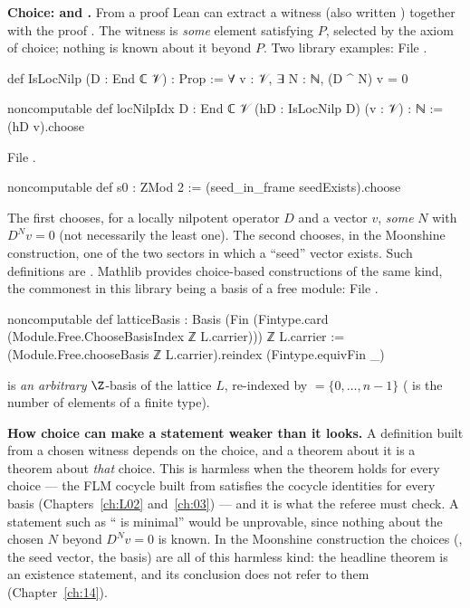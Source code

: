 \textbf{Choice:  and .} From a proof 
Lean can extract a witness  (also written ) together with
the proof . The witness is \emph{some} element satisfying $P$,
selected by the axiom of choice; nothing is known about it beyond $P$. Two library examples:
\noindent File .
\begin{leancode}
def IsLocNilp (D : End ℂ 𝒱) : Prop := ∀ v : 𝒱, ∃ N : ℕ, (D ^ N) v = 0

noncomputable def locNilpIdx {D : End ℂ 𝒱} (hD : IsLocNilp D) (v : 𝒱) : ℕ := (hD v).choose
\end{leancode}
\noindent File .
\begin{leancode}
noncomputable def s0 : ZMod 2 := (seed_in_frame seedExists).choose
\end{leancode}
The first chooses, for a locally nilpotent operator $D$ and a vector $v$, \emph{some} $N$ with
$D^Nv = 0$ (not necessarily the least one). The second chooses, in the Moonshine construction, one of
the two sectors in which a ``seed'' vector exists. Such definitions are . Mathlib
provides choice-based constructions of the same kind, the commonest in this library being a basis of
a free module:
\noindent File .
\begin{leancode}
noncomputable def latticeBasis :
    Basis (Fin (Fintype.card (Module.Free.ChooseBasisIndex ℤ L.carrier))) ℤ L.carrier :=
  (Module.Free.chooseBasis ℤ L.carrier).reindex (Fintype.equivFin _)
\end{leancode}
 is \emph{an arbitrary} $\Z$-basis of the lattice $L$,
re-indexed by  $=\{0,\dots,n-1\}$ ( is the number of elements of a
finite type).

\begin{warning}
\textbf{How choice can make a statement weaker than it looks.} A definition built from a chosen
witness depends on the choice, and a theorem about it is a theorem about \emph{that} choice. This is
harmless when the theorem holds for every choice --- the FLM cocycle built from
 satisfies the cocycle identities for every basis (Chapters~\ref{ch:L02}
and~\ref{ch:03}) --- and it is what the referee must check. A statement such as ``
is minimal'' would be unprovable, since nothing about the chosen $N$ beyond $D^Nv = 0$ is known. In
the Moonshine construction the choices (, the seed vector, the basis) are all of this
harmless kind: the headline theorem is an existence statement, and its conclusion does not refer to
them (Chapter~\ref{ch:14}).
\end{warning}

